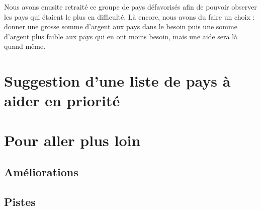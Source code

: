\documentclass[
]{article}
\begin{document}
Nous avons enusite retraité ce groupe de pays défavorisés afin de
pouvoir observer les pays qui étaient le plus en difficulté. Là encore,
nous avons du faire un choix : donner une grosse somme d'argent aux pays
dans le besoin puis une somme d'argent plus faible aux pays qui en ont
moins besoin, mais une aide sera là quand même.

\hypertarget{suggestion-dune-liste-de-pays-uxe0-aider-en-priorituxe9}{%
\section{Suggestion d'une liste de pays à aider en
priorité}\label{suggestion-dune-liste-de-pays-uxe0-aider-en-priorituxe9}}

\hypertarget{pour-aller-plus-loin}{%
\section{Pour aller plus loin}\label{pour-aller-plus-loin}}

\hypertarget{amuxe9liorations}{%
\subsection{Améliorations}\label{amuxe9liorations}}

\hypertarget{pistes}{%
\subsection{Pistes}\label{pistes}}
\end{document}
